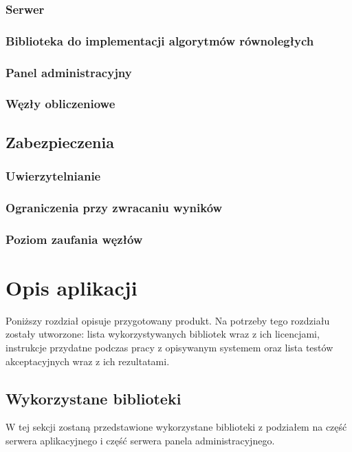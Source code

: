\documentclass[a4paper,11pt,twoside]{report}
\theoremstyle{definition}
\begin{document}
        \subsection{Serwer}
        \subsection{Biblioteka do implementacji algorytmów równoległych}
        \subsection{Panel administracyjny}
        \subsection{Węzły obliczeniowe}
    
    \section{Zabezpieczenia}
        \subsection{Uwierzytelnianie}
        \subsection{Ograniczenia przy zwracaniu wyników}
        \subsection{Poziom zaufania węzłów}

\chapter{Opis aplikacji}
    Poniższy rozdział opisuje przygotowany produkt. Na potrzeby tego rozdziału zostały utworzone: lista wykorzystywanych bibliotek wraz z ich licencjami, instrukcje przydatne podczas pracy z opisywanym systemem oraz lista testów akceptacyjnych wraz z ich rezultatami.
    
    \section{Wykorzystane biblioteki}
         W tej sekcji zostaną przedstawione wykorzystane biblioteki z podziałem na część serwera aplikacyjnego i część serwera panela administracyjnego.
        
\end{document}
